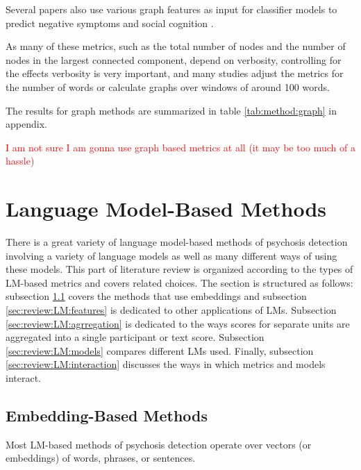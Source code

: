 Several papers also use various graph features as input for classifier models to predict negative symptoms \citep{mota2022happy, tang2023latent} and social cognition \citep{tang2022clinical}.

As many of these metrics, such as the total number of nodes and the number of nodes in the largest connected component, depend on verbosity, controlling for the effects verbosity is very important, and many studies adjust the metrics for the number of words or calculate graphs over windows of around 100 words.

The results for graph methods are summarized in table \ref{tab:method:graph} in appendix.

\textcolor{red}{I am not sure I am gonna use graph based metrics at all (it may be too much of a hassle)}


\section{Language Model-Based Methods}
\label{sec:review:LM}

There is a great variety of language model-based methods of psychosis detection involving a variety of language models as well as many different ways of using these models. This part of literature review is organized according to the types of LM-based metrics and covers related choices. The section is structured as follows: subsection \ref{sec:review:LM:embeddings} covers the methods that use embeddings and subsection \ref{sec:review:LM:features} is dedicated to other applications of LMs. Subsection \ref{sec:review:LM:agrregation} is dedicated to the ways scores for separate units are aggregated into a single participant or text score. Subsection \ref{sec:review:LM:models} compares different LMs used. Finally, subsection \ref{sec:review:LM:interaction} discusses the ways in which metrics and models interact.

\subsection{Embedding-Based Methods}
\label{sec:review:LM:embeddings}
Most LM-based methods of psychosis detection operate over vectors (or embeddings) of words, phrases, or sentences. 

